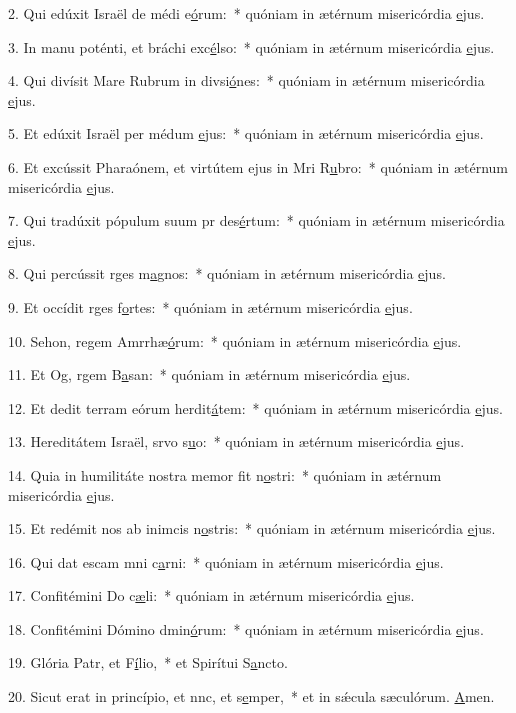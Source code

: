 2. Qui edúxit Israël de médi e\uline{ó}rum:~* quóniam in ætérnum misericórdia \uline{e}jus.\par 
3. In manu poténti, et bráchi exc\uline{é}lso:~* quóniam in ætérnum misericórdia \uline{e}jus.\par 
4. Qui divísit Mare Rubrum in divsi\uline{ó}nes:~* quóniam in ætérnum misericórdia \uline{e}jus.\par 
5. Et edúxit Israël per médum \uline{e}jus:~* quóniam in ætérnum misericórdia \uline{e}jus.\par 
6. Et excússit Pharaónem, et virtútem ejus in Mri R\uline{u}bro:~* quóniam in ætérnum misericórdia \uline{e}jus.\par 
7. Qui tradúxit pópulum suum pr des\uline{é}rtum:~* quóniam in ætérnum misericórdia \uline{e}jus.\par 
8. Qui percússit rges m\uline{a}gnos:~* quóniam in ætérnum misericórdia \uline{e}jus.\par 
9. Et occídit rges f\uline{o}rtes:~* quóniam in ætérnum misericórdia \uline{e}jus.\par 
10. Sehon, regem Amrrhæ\uline{ó}rum:~* quóniam in ætérnum misericórdia \uline{e}jus.\par 
11. Et Og, rgem B\uline{a}san:~* quóniam in ætérnum misericórdia \uline{e}jus.\par 
12. Et dedit terram eórum herdit\uline{á}tem:~* quóniam in ætérnum misericórdia \uline{e}jus.\par 
13. Hereditátem Israël, srvo s\uline{u}o:~* quóniam in ætérnum misericórdia \uline{e}jus.\par 
14. Quia in humilitáte nostra memor fit n\uline{o}stri:~* quóniam in ætérnum misericórdia \uline{e}jus.\par 
15. Et redémit nos ab inimcis n\uline{o}stris:~* quóniam in ætérnum misericórdia \uline{e}jus.\par 
16. Qui dat escam mni c\uline{a}rni:~* quóniam in ætérnum misericórdia \uline{e}jus.\par 
17. Confitémini Do c\uline{æ}li:~* quóniam in ætérnum misericórdia \uline{e}jus.\par 
18. Confitémini Dómino dmin\uline{ó}rum:~* quóniam in ætérnum misericórdia \uline{e}jus.\par 
19. Glória Patr, et F\uline{í}lio,~* et Spirítui S\uline{a}ncto.\par 
20. Sicut erat in princípio, et nnc, et s\uline{e}mper,~* et in sǽcula sæculórum. \uline{A}men.\par 
